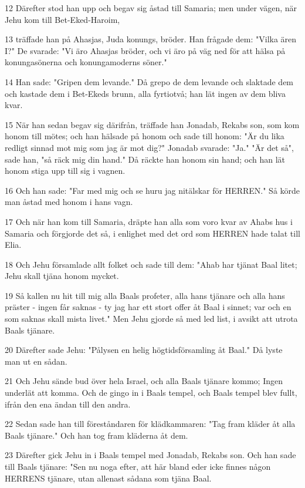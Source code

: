 \par 12 Därefter stod han upp och begav sig åstad till Samaria; men under vägen, när Jehu kom till Bet-Eked-Haroim,
\par 13 träffade han på Ahasjas, Juda konungs, bröder. Han frågade dem: "Vilka ären I?" De svarade: "Vi äro Ahasjas bröder, och vi äro på väg ned för att hälsa på konungasönerna och konungamoderns söner."
\par 14 Han sade: "Gripen dem levande." Då grepo de dem levande och slaktade dem och kastade dem i Bet-Ekeds brunn, alla fyrtiotvå; han lät ingen av dem bliva kvar.
\par 15 När han sedan begav sig därifrån, träffade han Jonadab, Rekabs son, som kom honom till mötes; och han hälsade på honom och sade till honom: "Är du lika redligt sinnad mot mig som jag är mot dig?" Jonadab svarade: "Ja." "Är det så", sade han, "så räck mig din hand." Då räckte han honom sin hand; och han lät honom stiga upp till sig i vagnen.
\par 16 Och han sade: "Far med mig och se huru jag nitälskar för HERREN." Så körde man åstad med honom i hans vagn.
\par 17 Och när han kom till Samaria, dräpte han alla som voro kvar av Ahabs hus i Samaria och förgjorde det så, i enlighet med det ord som HERREN hade talat till Elia.
\par 18 Och Jehu församlade allt folket och sade till dem: "Ahab har tjänat Baal litet; Jehu skall tjäna honom mycket.
\par 19 Så kallen nu hit till mig alla Baals profeter, alla hans tjänare och alla hans präster - ingen får saknas - ty jag har ett stort offer åt Baal i sinnet; var och en som saknas skall mista livet." Men Jehu gjorde så med led list, i avsikt att utrota Baals tjänare.
\par 20 Därefter sade Jehu: "Pålysen en helig högtidsförsamling åt Baal." Då lyste man ut en sådan.
\par 21 Och Jehu sände bud över hela Israel, och alla Baals tjänare kommo; Ingen underlät att komma. Och de gingo in i Baals tempel, och Baals tempel blev fullt, ifrån den ena ändan till den andra.
\par 22 Sedan sade han till föreståndaren för klädkammaren: "Tag fram kläder åt alla Baals tjänare." Och han tog fram kläderna åt dem.
\par 23 Därefter gick Jehu in i Baals tempel med Jonadab, Rekabs son. Och han sade till Baals tjänare: "Sen nu noga efter, att här bland eder icke finnes någon HERRENS tjänare, utan allenast sådana som tjäna Baal.
